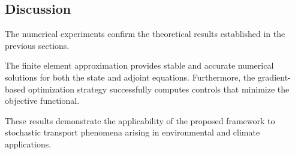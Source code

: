 \subsection{Discussion}

The numerical experiments confirm the theoretical results established in the previous sections.

The finite element approximation provides stable and accurate numerical solutions for both the 
state and adjoint equations. Furthermore, the gradient-based optimization strategy successfully 
computes controls that minimize the objective functional.

These results demonstrate the applicability of the proposed framework to stochastic transport 
phenomena arising in environmental and climate applications.
